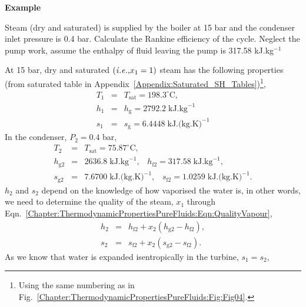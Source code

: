    \begin{MyExample}{\begin{center}{\bf Example}\end{center}}
     \begin{example}\label{Chapter:ThermodynamicPropertiesPureFluids:Example6} 
        Steam (dry and saturated) is supplied by the boiler at 15 bar and the condenser inlet pressure is 0.4 bar. Calculate the Rankine efficiency of the cycle. Neglect the pump work, assume the enthalpy of fluid leaving the pump is 317.58 kJ.kg$^{-1}$
     \end{example}

          At 15 bar, dry and saturated $\left({\it i.e., } x_{1}=1\right)$ steam has the following properties (from saturated table in Appendix~\ref{Appendix:Saturated_SH_Tables})\footnote{Using the same numbering as in Fig.~\ref{Chapter:ThermodynamicPropertiesPureFluids:Fig:Fig04}.},
          \begin{eqnarray}
             T_{1} &=& T_{\text{sat}} = 198.3^{\circ}\text{C},\nonumber \\
             h_{1} &=& h_{\text{g}} = 2792.2\; \text{kJ.kg}^{-1} \nonumber \\
             s_{1} &=& s_{\text{g}} = 6.4448\; \text{kJ.(kg.K)}^{-1} \nonumber
          \end{eqnarray} 
    In the condenser, $P_{2}=0.4$ bar,
          \begin{eqnarray}
              T_{2} &=& T_{\text{sat}} = 75.87^{\circ}\text{C}, \nonumber \\
              h_{\text{g}2} &=& 2636.8\;\text{kJ.kg}^{-1},\;\;\; h_{\text{f}2} = 317.58\;\text{kJ.kg}^{-1},  \nonumber \\
              s_{\text{g}2} &=& 7.6700 \;\text{kJ.(kg.K)}^{-1},\;\;\; s_{\text{f}2} = 1.0259\;\text{kJ.(kg.K)}^{-1}. \nonumber  
          \end{eqnarray}
$h_{2}$ and $s_{2}$ depend on the knowledge of how vaporised the water is, in other words, we need to determine the quality of the steam, $x_{1}$ through Eqn.~\ref{Chapter:ThermodynamicPropertiesPureFluids:Eqn:QualityVapour},
      \begin{eqnarray}
          h_{2} &=& h_{\text{f}2} + x_{2}\left(h_{\text{g}2} - h_{\text{f}2}\right), \nonumber \\
          s_{2} &=& s_{\text{f}2} + x_{2}\left(s_{\text{g}2} - s_{\text{f}2}\right). \nonumber
      \end{eqnarray}
As we know that water is expanded isentropically in the turbine, \ie $s_{1}=s_{2}$,

\end{MyExample}
